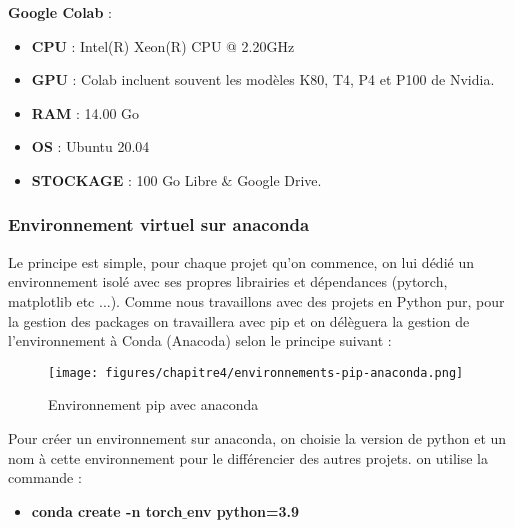        \textbf{Google Colab} : 
        \begin{itemize}[label=•]
            \setlength{\itemsep}{5pt}
            \item  \textbf{CPU} : Intel(R) Xeon(R) CPU @ 2.20GHz
            \item  \textbf{GPU} : Colab incluent souvent les modèles K80, T4, P4 et P100 de Nvidia. 
            \item  \textbf{RAM} : 14.00 Go
            \item  \textbf{OS} : Ubuntu 20.04
            \item  \textbf{STOCKAGE} : 100 Go Libre \& Google Drive.
        \end{itemize}
    
        \subsubsection{Environnement virtuel sur anaconda }
        
        \par Le principe est simple, pour chaque projet qu'on commence, on lui dédié un environnement isolé avec ses propres librairies et dépendances (pytorch, matplotlib etc ...). Comme nous travaillons avec des projets en Python pur, pour la gestion des packages on travaillera avec pip et on délèguera la gestion de l’environnement à Conda (Anacoda) selon le principe suivant :
        
        \begin{figure}[H]
        	\begin{center}
        		\texttt{[image: figures/chapitre4/environnements-pip-anaconda.png]}
        	\end{center}
        	\caption {Environnement pip avec anaconda}
        	\label{fig:envcondapip}
        \end{figure}  
    
        
        \par Pour créer un environnement sur anaconda, on choisie la version de python et un nom à cette environnement pour le différencier des autres projets. on utilise la commande :
        \begin{itemize}[label=|]
        \setlength{\itemsep}{5pt}
            \item \textbf{\large{conda create -n torch$\_$env python=3.9}}\\
        \end{itemize}
        
